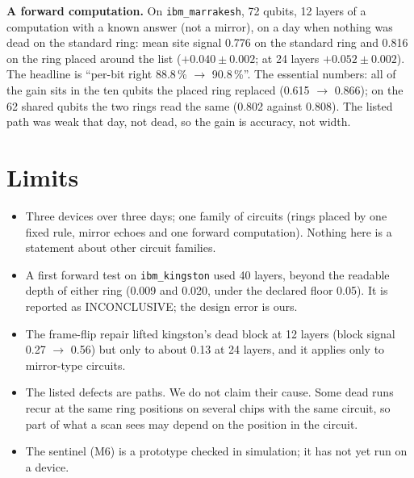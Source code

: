 \documentclass[10pt,a4paper]{article}
\begin{document}
\textbf{A forward computation.} On \texttt{ibm\_marrakesh}, 72 qubits, 12 layers of a computation with a known answer
(not a mirror), on a day when nothing was dead on the standard ring: mean site signal 0.776 on the standard ring and
0.816 on the ring placed around the list ($+0.040\pm0.002$; at 24 layers $+0.052\pm0.002$). The headline is ``per-bit
right 88.8\,\% $\to$ 90.8\,\%''. The essential numbers: all of the gain sits in the ten qubits the placed ring
replaced (0.615 $\to$ 0.866); on the 62 shared qubits the two rings read the same (0.802 against 0.808). The listed
path was weak that day, not dead, so the gain is accuracy, not width.

\section{Limits}

\begin{itemize}
\item Three devices over three days; one family of circuits (rings placed by one fixed rule, mirror echoes and one
  forward computation). Nothing here is a statement about other circuit families.
\item A first forward test on \texttt{ibm\_kingston} used 40 layers, beyond the readable depth of either ring (0.009
  and 0.020, under the declared floor 0.05). It is reported as INCONCLUSIVE; the design error is ours.
\item The frame-flip repair lifted kingston's dead block at 12 layers (block signal 0.27 $\to$ 0.56) but only to about
  0.13 at 24 layers, and it applies only to mirror-type circuits.
\item The listed defects are paths. We do not claim their cause. Some dead runs recur at the same ring positions on
  several chips with the same circuit, so part of what a scan sees may depend on the position in the circuit.
\item The sentinel (M6) is a prototype checked in simulation; it has not yet run on a device.
\end{itemize}
\end{document}
